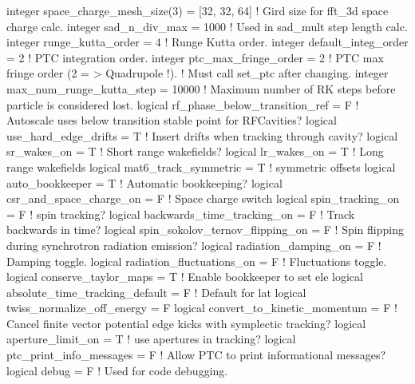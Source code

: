 {{{{{{{\begin{example}
    integer space_charge_mesh_size(3) = [32, 32, 64]  ! Gird size for fft_3d space charge calc.
    integer sad_n_div_max = 1000                ! Used in sad_mult step length calc.
    integer runge_kutta_order = 4               ! Runge Kutta order.
    integer default_integ_order = 2             ! PTC integration order.
    integer ptc_max_fringe_order = 2            ! PTC max fringe order (2  = > Quadrupole !).
                                                !   Must call set_ptc after changing.
    integer max_num_runge_kutta_step = 10000    ! Maximum number of RK steps before particle is considered lost.
    logical rf_phase_below_transition_ref = F   ! Autoscale uses below transition stable point for RFCavities?
    logical use_hard_edge_drifts = T            ! Insert drifts when tracking through cavity?
    logical sr_wakes_on = T                     ! Short range wakefields?
    logical lr_wakes_on = T                     ! Long range wakefields
    logical mat6_track_symmetric = T            ! symmetric offsets
    logical auto_bookkeeper = T                 ! Automatic bookkeeping?
    logical csr_and_space_charge_on = F         ! Space charge switch
    logical spin_tracking_on = F                ! spin tracking?
    logical backwards_time_tracking_on = F      ! Track backwards in time?
    logical spin_sokolov_ternov_flipping_on = F ! Spin flipping during synchrotron radiation emission?
    logical radiation_damping_on = F            ! Damping toggle.
    logical radiation_fluctuations_on = F       ! Fluctuations toggle.
    logical conserve_taylor_maps = T            ! Enable bookkeeper to set ele%
    logical absolute_time_tracking_default = F  ! Default for lat%
    logical twiss_normalize_off_energy = F
    logical convert_to_kinetic_momentum = F     ! Cancel finite vector potential edge kicks with symplectic tracking?
    logical aperture_limit_on = T               ! use apertures in tracking?
    logical ptc_print_info_messages = F         ! Allow PTC to print informational messages?
    logical debug = F                           ! Used for code debugging.





\end{example}}}}}}}}

